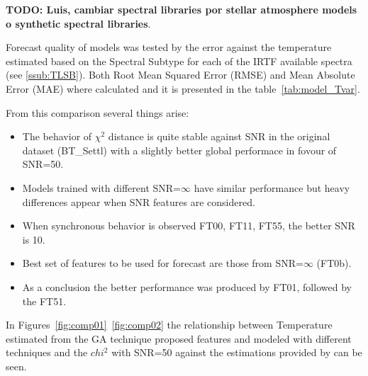 {\bf TODO: Luis, cambiar spectral libraries por stellar atmosphere
models o synthetic spectral libraries}.

Forecast quality of models was tested by the error against the
temperature estimated based on the Spectral Subtype for each of the
IRTF available spectra (see \ref{ssub:TLSB}).  Both Root Mean Squared
Error (RMSE) and Mean Absolute Error (MAE) where calculated and it is
presented in the table~\ref{tab:model_Tvar}.

From this comparison several things arise:
\begin{itemize}
 \item {The behavior of $\chi^2$ distance is quite stable against SNR 
	in the original dataset (BT\_Settl) with a slightly better global 
	performace in fovour of SNR=50.}
 \item {Models trained with different SNR=$\infty$ have similar performance but heavy 
	differences appear when SNR features are considered.}
 \item {When synchronous behavior is observed FT00, FT11, FT55, the better SNR is 10.}
 \item {Best set of features to be used for forecast are those from SNR=$\infty$ (FT0b).}
 \item {As a conclusion the better performance was produced by FT01, followed by the FT51.}
\end{itemize}

In Figures~\ref{fig:comp01}~\ref{fig:comp02} the relationship between Temperature
estimated from the GA technique proposed features and modeled with different 
techniques and the $chi^2$ with SNR=50 against the 
estimations provided by \cite{cesetti} can be seen.

